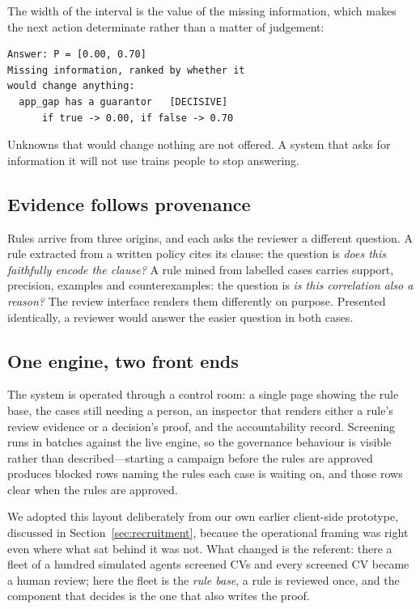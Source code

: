 \documentclass[sigconf,nonacm]{acmart}
\begin{document}
The width of the interval is the value of the missing information, which makes
the next action determinate rather than a matter of judgement:

\begin{lstlisting}
Answer: P = [0.00, 0.70]
Missing information, ranked by whether it
would change anything:
  app_gap has a guarantor   [DECISIVE]
      if true -> 0.00, if false -> 0.70
\end{lstlisting}

Unknowns that would change nothing are not offered. A system that asks for
information it will not use trains people to stop answering.

\subsection{Evidence follows provenance}

Rules arrive from three origins, and each asks the reviewer a different
question. A rule extracted from a written policy cites its clause: the question
is \emph{does this faithfully encode the clause?} A rule mined from labelled
cases carries support, precision, examples and counterexamples: the question is
\emph{is this correlation also a reason?} The review interface renders them
differently on purpose. Presented identically, a reviewer would answer the
easier question in both cases.

\subsection{One engine, two front ends}

The system is operated through a control room: a single page showing the rule
base, the cases still needing a person, an inspector that renders either a
rule's review evidence or a decision's proof, and the accountability record.
Screening runs in batches against the live engine, so the governance behaviour
is visible rather than described---starting a campaign before the rules are
approved produces blocked rows naming the rules each case is waiting on, and
those rows clear when the rules are approved.

We adopted this layout deliberately from our own earlier client-side prototype,
discussed in Section~\ref{sec:recruitment}, because the operational framing was
right even where what sat behind it was not. What changed is the referent: there
a fleet of a hundred simulated agents screened CVs and every screened CV became
a human review; here the fleet is the \emph{rule base}, a rule is reviewed once,
and the component that decides is the one that also writes the proof.
\end{document}
